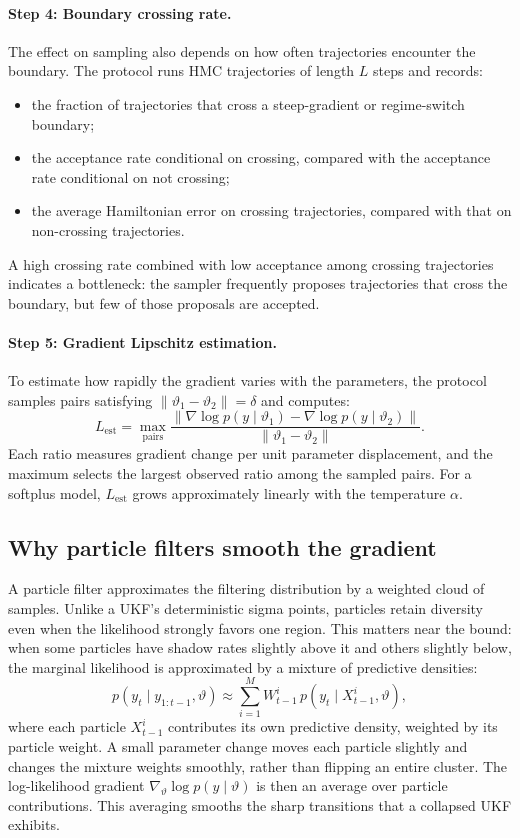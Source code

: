 \documentclass[11pt]{article}
\begin{document}
\paragraph{Step 4: Boundary crossing rate.}
The effect on sampling also depends on how often trajectories encounter the boundary. The protocol runs HMC trajectories of length $L$ steps and records:
\begin{itemize}
\item the fraction of trajectories that cross a steep-gradient or regime-switch boundary;
\item the acceptance rate conditional on crossing, compared with the acceptance rate conditional on not crossing;
\item the average Hamiltonian error on crossing trajectories, compared with that on non-crossing trajectories.
\end{itemize}
A high crossing rate combined with low acceptance among crossing trajectories indicates a bottleneck: the sampler frequently proposes trajectories that cross the boundary, but few of those proposals are accepted.

\paragraph{Step 5: Gradient Lipschitz estimation.}
To estimate how rapidly the gradient varies with the parameters, the protocol samples pairs satisfying $\|\vartheta_1 - \vartheta_2\| = \delta$ and computes:
\[
 L_{\text{est}} = \max_{\text{pairs}}
   \frac{\|\nabla\log p(y\mid\vartheta_1) - \nabla\log p(y\mid\vartheta_2)\|}
        {\|\vartheta_1 - \vartheta_2\|}.
\]
Each ratio measures gradient change per unit parameter displacement, and the maximum selects the largest observed ratio among the sampled pairs. For a softplus model, $L_{\text{est}}$ grows approximately linearly with the temperature $\alpha$.

\subsection{Why particle filters smooth the gradient}\label{sec:pf-smoothing}

A particle filter approximates the filtering distribution by a weighted cloud of samples. Unlike a UKF's deterministic sigma points, particles retain diversity even when the likelihood strongly favors one region. This matters near the bound: when some particles have shadow rates slightly above it and others slightly below, the marginal likelihood is approximated by a mixture of predictive densities:
\[
 p(y_t\mid y_{1:t-1},\vartheta)
 \approx \sum_{i=1}^M W_{t-1}^i\, p(y_t\mid X_{t-1}^i,\vartheta),
\]
where each particle $X_{t-1}^i$ contributes its own predictive density, weighted by its particle weight. A small parameter change moves each particle slightly and changes the mixture weights smoothly, rather than flipping an entire cluster. The log-likelihood gradient $\nabla_\vartheta\log p(y\mid\vartheta)$ is then an average over particle contributions. This averaging smooths the sharp transitions that a collapsed UKF exhibits.
\end{document}

